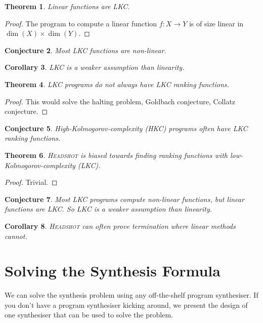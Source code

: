 \documentclass[preprint]{sigplanconf}
\newtheorem{theorem}{Theorem}
\newtheorem{corollary}[theorem]{Corollary}
\newtheorem{conjecture}[theorem]{Conjecture}
\theoremstyle{definition}
\begin{document}
\begin{theorem}
 Linear functions are LKC.
\end{theorem}

\begin{proof}
 The program to compute a linear function $f: X \to Y$ is of size linear in
 $\dim(X) \times \dim(Y)$.
\end{proof}


\begin{conjecture}
 Most LKC functions are non-linear.
\end{conjecture}

\begin{corollary}
 LKC is a weaker assumption than linearity.
\end{corollary}


\begin{theorem}
 LKC programs do not always have LKC ranking functions.
\end{theorem}

\begin{proof}
 This would solve the halting problem, Goldbach conjecture, Collatz conjecture.
\end{proof}

\begin{conjecture}
 High-Kolmogorov-complexity (HKC) programs often have LKC ranking functions.
\end{conjecture}

\begin{theorem}
 \textsc{Headshot} is biased towards finding ranking functions with
 low-Kolmogorov-complexity (LKC).
\end{theorem}

\begin{proof}
 Trivial.
\end{proof}

\begin{conjecture}
 Most LKC programs compute non-linear functions, but linear functions are LKC.
 So LKC is a weaker assumption than linearity.
\end{conjecture}

\begin{corollary}
 \textsc{Headshot} can often prove termination where linear methods cannot.
\end{corollary}



\section{Solving the Synthesis Formula}
We can solve the synthesis problem using any off-the-shelf program synthesiser.  If you don't
have a program synthesiser kicking around, we present the design of one synthesiser
that can be used to solve the problem.
\end{document}
